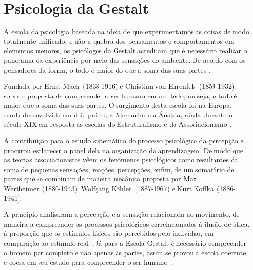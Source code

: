 \section{Psicologia da Gestalt}\label{gestalt}

A escola da psicologia baseada na ideia de que experimentamos as coisas de modo totalmente unificado, e não a quebra dos pensamentos e comportamentos em elementos menores, os psicólogos da Gestalt acreditam que é necessário realizar o panorama da experiência por meio das sensações do ambiente. 
De acordo com os pensadores da forma, o todo é maior do que a soma das suas partes \cite{bock1999psicologias}.

Fundada por Ernst Mach~(1838-1916) e Christian von Ehrenfels~(1859-1932) sobre a proposta de compreender o ser humano em um todo, ou seja, o todo é maior que a soma das suas partes.
O surgimento desta escola foi na Europa, sendo desenvolvida em dois países, a Alemanha e a Áustria, ainda durante o século XIX em resposta às escolas do Estruturalismo e do Associacionismo \cite{bock1999psicologias}.

A contribuição para o estudo sistemático do processo psicológico da percepção e procurou esclarecer o papel dela na organização da aprendizagem.
De modo que as teorias associacionistas vêem os fenômenos psicológicos como resultantes da soma de pequenas sensações, reações, percepções, enfim, de um somatório de partes que se combinam de maneira mecânica proposta por Max Wertheimer~(1880-1943), Wolfgang Köhler~(1887-1967) e Kurt Koffka~(1886-1941)\cite{hothersall1997historia}.

A princípio analisaram a percepção e a sensação relacionada ao movimento, de maneira a compreender os processos psicológicos correlacionados à ilusão de ótica, à proporção que os estímulos físicos são percebidos pelo indivíduo, em comparação ao estímulo real \cite{bock1999psicologias}.
Já para a Escola Gestalt é necessário compreender o homem por completo e não apenas as partes, assim se provou a escola coerente e coesa em seu estudo para compreender o ser humano~\cite{silva2007psicologia_educacao}.

